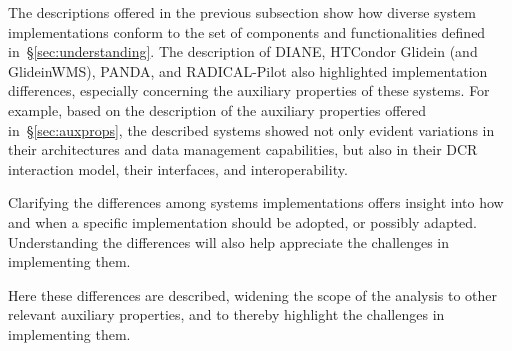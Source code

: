 \documentclass{sig-alternate}
\begin{document}

The descriptions offered in the previous subsection show how diverse \pilot
system implementations conform to the set of components and functionalities
defined in~\S\ref{sec:understanding}.  The description of DIANE, HTCondor
Glidein (and GlideinWMS), PANDA, and RADICAL-Pilot also highlighted
implementation differences, especially concerning the auxiliary properties of
these \pilot systems. For example, based on the description of the auxiliary
properties offered in~\S\ref{sec:auxprops}, the described \pilot systems showed
not only evident variations in their architectures and data management
capabilities, but also in their DCR interaction model, their interfaces, and
interoperability.


Clarifying the differences among \pilot systems implementations offers insight
into how and when a specific implementation should be adopted, or possibly
adapted. Understanding the differences will also help appreciate the challenges
in implementing them.

 Here these differences are described, widening the scope of
the analysis to other relevant auxiliary properties, and to thereby highlight
the challenges in implementing them.
\end{document}
